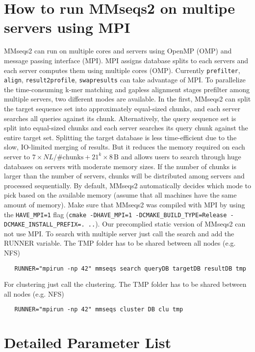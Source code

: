 \documentclass[11pt,a4paper]{scrreprt}
\begin{document}
\section{How to run MMseqs2 on multipe servers using MPI}
MMseqs2 can run on multiple cores and servers using OpenMP (OMP) and message passing interface (MPI). MPI assigns database splits to each servers and each server computes them using multiple cores (OMP). Currently \texttt{prefilter}, \texttt{align}, \texttt{result2profile}, \texttt{swapresults} can take advantage of MPI.
To parallelize the time-consuming k-mer matching and gapless alignment stages prefilter among multiple servers, two different modes are available. In the first, MMseqs2 can split the target sequence set into approximately equal-sized chunks, and each server searches all queries against its chunk. Alternatively, the query sequence set is split into equal-sized chunks and each server searches its query chunk against the entire target set. Splitting the target database is less time-efficient due to the slow, IO-limited merging of results. But it reduces the memory required on each server to  $7 \times NL / \text{\#chunks} + 21^k \times 8\,\mathrm{B}$
 and allows users to search through huge databases on servers with moderate memory sizes. If the number of chunks is larger than the number of servers, chunks will be distributed among servers and processed sequentially. By default, MMseqs2 automatically decides which mode to pick based on the available memory (assume that all machines have the same amount of memory).
Make sure that MMseqs2 was compiled with MPI by using the \texttt{HAVE\_MPI=1} flag (\texttt{cmake -DHAVE\_MPI=1 -DCMAKE\_BUILD\_TYPE=Release -DCMAKE\_INSTALL\_PREFIX=. ..}). Our precomplied static version of MMseqs2 can not use MPI.
To search with multiple server just call the search and add the RUNNER variable. The TMP folder has to be shared between all nodes (e.g. NFS)
\begin{verbatim}
   RUNNER="mpirun -np 42" mmseqs search queryDB targetDB resultDB tmp
\end{verbatim}

For clustering just call the clustering. The TMP folder has to be shared between all nodes (e.g. NFS)
\begin{verbatim}
   RUNNER="mpirun -np 42" mmseqs cluster DB clu tmp
\end{verbatim}





\section{Detailed Parameter List} \label{sec:Detailed-parameter-list}
\end{document}
